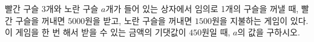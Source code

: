 빨간 구슬 3개와 노란 구슬 $a$개가 들어 있는 상자에서 임의로 1개의 구슬을 꺼낼 때, 빨간 구슬을 꺼내면 $5000$원을 받고, 노란 구슬을 꺼내면 $1500$원을 지불하는 게임이 있다. 이 게임을 한 번 해서 받을 수 있는 금액의 기댓값이 $450$원일 때, $a$의 값을 구하시오.
